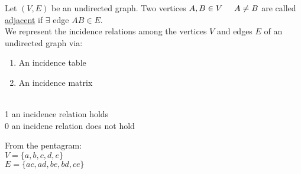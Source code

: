 \documentclass[10pt]{article}
\begin{document}
\begin{description}
\begin{figure}[h!]
		\end{figure}
		\item[Definition:] Let $(V,E)$ be an undirected graph. Two vertices $A, B \in V \hspace{5mm} A \neq B$ are called \underline{adjacent} if $\exists$ edge $AB \in E$. \\
		We represent the incidence relations among the vertices $V$ and edges $E$ of an undirected graph via:
		\begin{enumerate}
			\item An incidence table
			\item An incidence matrix
		\end{enumerate}
		\item[Legend:] ~\\
		1 an incidence relation holds \\
		0 an incidene relation does not hold \\
		\item From the pentagram: \\
		$V = \{a, b, c, d, e\}$ \\
		$E = \{ac, ad, be, bd, ce\}$ \\
		\pagebreak
		\begin{figure}[h!]
			\centering
\end{figure}
\end{description}
\end{document}
